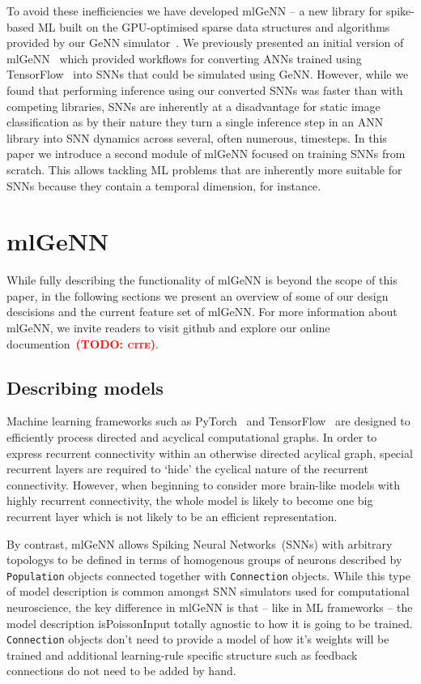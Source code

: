 \documentclass[sigconf]{acmart}
\newcommand{\todo}[1]{\textbf{\textsc{\textcolor{red}{(TODO: #1)}}}}
\begin{document}
To avoid these inefficiencies we have developed mlGeNN -- a new library for spike-based ML built on the GPU-optimised sparse data structures and algorithms provided by our GeNN simulator~\citep{Yavuz2016,Knight2018,Knight2021}.
We previously presented an initial version of mlGeNN~\citep{Turner2022} which provided workflows for converting ANNs trained using TensorFlow~\citep{TensorFlow} into SNNs that could be simulated using GeNN.
However, while we found that performing inference using our converted SNNs was faster than with competing libraries, SNNs are inherently at a disadvantage for static image classification as by their nature they turn a single inference step in an ANN library into SNN dynamics across several, often numerous, timesteps.
In this paper we introduce a second module of mlGeNN focused on training SNNs from scratch. This allows tackling ML problems that are inherently more suitable for SNNs because they contain a temporal dimension, for instance.

\section{mlGeNN}
While fully describing the functionality of mlGeNN is beyond the scope of this paper, in the following sections we present an overview of some of our design descisions and the current feature set of mlGeNN.
For more information about mlGeNN, we invite readers to visit github and explore our online documention~\todo{cite}.

\subsection{Describing models}
Machine learning frameworks such as PyTorch~\citep{paszke2019pytorch} and TensorFlow~\citep{TensorFlow} are designed to efficiently process directed and acyclical computational graphs.
In order to express recurrent connectivity within an otherwise directed acylical graph, special recurrent layers are required to `hide' the cyclical nature of the recurrent connectivity.
However, when beginning to consider more brain-like models with highly recurrent connectivity, the whole model is likely to become one big recurrent layer which is not likely to be an efficient representation.

By contrast, mlGeNN allows Spiking Neural Networks~(SNNs) with arbitrary topologys to be defined in terms of homogenous groups of neurons described by \lstinline{Population} objects connected together with \lstinline{Connection} objects.
While this type of model description is common amongst SNN simulators used for computational neuroscience, the key difference in mlGeNN is that -- like in ML frameworks -- the model description isPoissonInput totally agnostic to how it is going to be trained.
\lstinline{Connection} objects don't need to provide a model of how it's weights will be trained and additional learning-rule specific structure such as feedback connections do not need to be added by hand.
\end{document}
